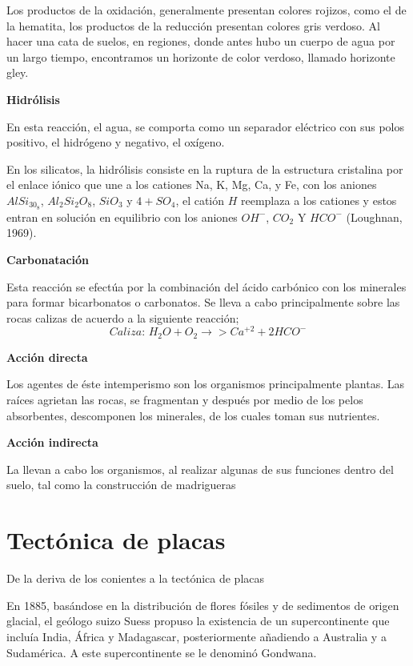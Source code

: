 Los productos de la oxidación, generalmente presentan colores rojizos, como el de la hematita, los productos de la reducción presentan colores gris verdoso. Al hacer una cata de suelos, en regiones, donde antes hubo un cuerpo de agua por un largo tiempo, encontramos un horizonte de color verdoso, llamado horizonte gley.

\textbf{Hidrólisis}

En esta reacción, el agua, se comporta como un separador eléctrico con sus polos positivo, el hidrógeno y negativo, el oxígeno.

En los silicatos, la hidrólisis consiste en la ruptura de la estructura cristalina por el enlace iónico que une a los cationes Na, K, Mg, Ca, y Fe, con los aniones $AlSi_30_8$, $Al_2Si_2O_8$, $SiO_3$ y $4+ SO_4$, el catión $H$ reemplaza a los cationes y estos entran en solución en equilibrio con los aniones $OH^-$, $CO_2$ Y $HCO^-$ (Loughnan, 1969).

\textbf{Carbonatación}

Esta reacción se efectúa por la combinación del ácido carbónico con los minerales para formar bicarbonatos o carbonatos. Se lleva a cabo principalmente sobre las rocas calizas de acuerdo a la siguiente reacción;
\begin{equation}
    Caliza:\, H_2O + O_2 \longrightarrow > Ca^{ + 2} + 2HCO^ -
\end{equation}

\textbf{Acción directa}

Los agentes de éste intemperismo son los organismos principalmente plantas. Las raíces agrietan las rocas, se fragmentan y después por medio de los pelos absorbentes, descomponen los minerales, de los cuales toman sus nutrientes.

\textbf{Acción indirecta}

La llevan a cabo los organismos, al realizar algunas de sus funciones dentro del suelo, tal como la construcción de madrigueras

\section{Tectónica de placas}
De la deriva de los conientes a la tectónica de placas

En 1885, basándose en la distribución de flores fósiles y de sedimentos de origen glacial, el geólogo suizo Suess propuso la existencia de un supercontinente que incluía India, África y Madagascar, posteriormente añadiendo a Australia y a Sudamérica. A este supercontinente se le denominó Gondwana.


